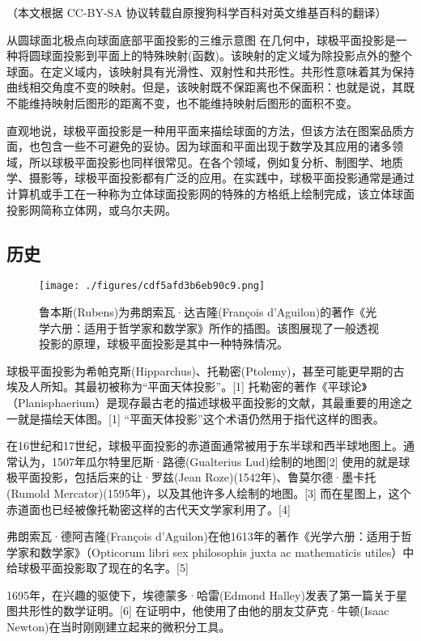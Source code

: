 
（本文根据 CC-BY-SA 协议转载自原搜狗科学百科对英文维基百科的翻译）

从圆球面北极点向球面底部平面投影的三维示意图
在几何中，球极平面投影是一种将圆球面投影到平面上的特殊映射(函数)。该映射的定义域为除投影点外的整个球面。在定义域内，该映射具有光滑性、双射性和共形性。共形性意味着其为保持曲线相交角度不变的映射。但是，该映射既不保距离也不保面积：也就是说，其既不能维持映射后图形的距离不变，也不能维持映射后图形的面积不变。

直观地说，球极平面投影是一种用平面来描绘球面的方法，但该方法在图案品质方面，也包含一些不可避免的妥协。因为球面和平面出现于数学及其应用的诸多领域，所以球极平面投影也同样很常见。在各个领域，例如复分析、制图学、地质学、摄影等，球极平面投影都有广泛的应用。在实践中，球极平面投影通常是通过计算机或手工在一种称为立体球面投影网的特殊的方格纸上绘制完成，该立体球面投影网简称立体网，或乌尔夫网。

\subsection{历史}
\begin{figure}[ht]
\centering
\texttt{[image: ./figures/cdf5afd3b6eb90c9.png]}
\caption{鲁本斯(Rubens)为弗朗索瓦·达吉隆(François d'Aguilon)的著作《光学六册：适用于哲学家和数学家》所作的插图。该图展现了一般透视投影的原理，球极平面投影是其中一种特殊情况。} \label{fig_QJPMTY_2}
\end{figure}
球极平面投影为希帕克斯(Hipparchus)、托勒密(Ptolemy)，甚至可能更早期的古埃及人所知。其最初被称为“平面天体投影”。[1] 托勒密的著作《平球论》（Planisphaerium）是现存最古老的描述球极平面投影的文献，其最重要的用途之一就是描绘天体图。[1] “平面天体投影”这个术语仍然用于指代这样的图表。

在16世纪和17世纪，球极平面投影的赤道面通常被用于东半球和西半球地图上。通常认为，1507年瓜尔特里厄斯·路德(Gualterius Lud)绘制的地图[2] 使用的就是球极平面投影，包括后来的让·罗兹(Jean Roze)(1542年)、鲁莫尔德·墨卡托(Rumold Mercator)(1595年)，以及其他许多人绘制的地图。[3] 而在星图上，这个赤道面也已经被像托勒密这样的古代天文学家利用了。[4]

弗朗索瓦·德阿吉隆(François d'Aguilon)在他1613年的著作《光学六册：适用于哲学家和数学家》（Opticorum libri sex philosophis juxta ac mathematicis utiles）中给球极平面投影取了现在的名字。[5]

1695年，在兴趣的驱使下，埃德蒙多·哈雷(Edmond Halley)发表了第一篇关于星图共形性的数学证明。[6] 在证明中，他使用了由他的朋友艾萨克·牛顿(Isaac Newton)在当时刚刚建立起来的微积分工具。

